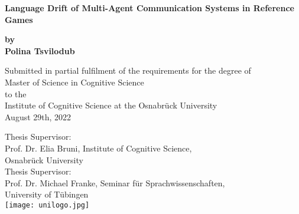 \begin{titlepage}
	\begin{center}
		\vspace*{1cm}
		\Huge
		\textbf{Language Drift of Multi-Agent Communication Systems in Reference Games\\} 
		\vspace{0.5cm}
		\Large
	
		\textbf{by \\ Polina Tsvilodub}
		
		\vspace{1cm}
		\small
		Submitted in partial fulfilment of the requirements for the degree of \\
		Master of Science in Cognitive Science \\ to the \\
		Institute of Cognitive Science at the Osnabrück University\\
		August 29th, 2022
		
		\vspace{2cm}
		Thesis Supervisor:\\ Prof. Dr. Elia Bruni, Institute of Cognitive Science, \\Osnabr\"uck University\\
		\vspace{0.5cm}
		Thesis Supervisor:\\ Prof. Dr. Michael Franke, Seminar f\"ur Sprachwissenschaften,\\ University of T\"ubingen \\  
		\vfill 
		\texttt{[image: unilogo.jpg]}
		
	\end{center}
\end{titlepage}